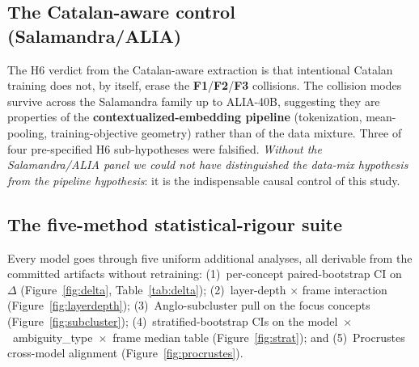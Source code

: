 \documentclass[10pt,twocolumn,a4paper]{article}
\newcommand{\Fone}{\textbf{F1}}
\newcommand{\Ftwo}{\textbf{F2}}
\newcommand{\Fthree}{\textbf{F3}}
\begin{document}
\subsection{The Catalan-aware control (Salamandra/ALIA)}

The H6 verdict from the Catalan-aware extraction is that intentional Catalan
training does not, by itself, erase the \Fone{}/\Ftwo{}/\Fthree{} collisions.
The collision modes survive across the Salamandra family up to ALIA-40B,
suggesting they are properties of the \textbf{contextualized-embedding
pipeline} (tokenization, mean-pooling, training-objective geometry) rather
than of the data mixture. Three of four pre-specified H6 sub-hypotheses were
falsified. \emph{Without the Salamandra/ALIA panel we could not have
distinguished the data-mix hypothesis from the pipeline hypothesis}: it is the
indispensable causal control of this study.

\subsection{The five-method statistical-rigour suite}

Every model goes through five uniform additional analyses, all derivable from
the committed artifacts without retraining:
(1)~per-concept paired-bootstrap CI on $\Delta$ (Figure~\ref{fig:delta},
Table~\ref{tab:delta}); (2)~layer-depth $\times$ frame interaction
(Figure~\ref{fig:layerdepth}); (3)~Anglo-subcluster pull on the focus concepts
(Figure~\ref{fig:subcluster}); (4)~stratified-bootstrap CIs on the
model~$\times$~ambiguity\_type~$\times$~frame median table
(Figure~\ref{fig:strat}); and (5)~Procrustes cross-model alignment
(Figure~\ref{fig:procrustes}).
\end{document}
